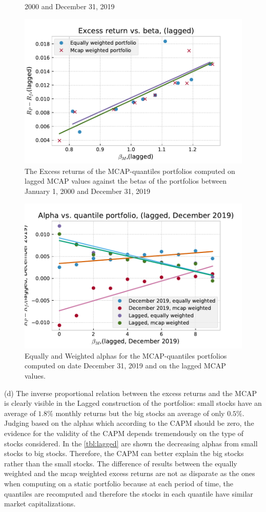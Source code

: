 \documentclass[10pt]{article}
\newenvironment{exercise}[2][Exercise]{\begin{trivlist}
  \item[\hskip \labelsep {\bfseries #1}\hskip \labelsep {\bfseries #2.}]}{\end{trivlist}}
\begin{document}
\begin{exercise}{2}
\begin{figure}[n]
{      2000 and December 31, 2019}
    \label{fig:december2019}
  \end{figure}
  \begin{figure}[H]
    \centering
    \includegraphics[width=0.7\linewidth]{lagged.pdf}
    \caption{The Excess returns of the MCAP-quantiles portfolios computed on
      lagged MCAP values against the betas of the portfolios between January 1,
      2000 and December 31, 2019}
    \label{fig:lagged}
  \end{figure}
  \begin{figure}[H]
    \centering
    \includegraphics[width=0.7\linewidth]{alphas.pdf}
    \caption{Equally and Weighted alphas for the MCAP-quantiles portfolios
      computed on date December 31, 2019 and on the lagged MCAP values.}
    \label{fig:alphas}
  \end{figure}


  (d) The inverse proportional relation between the excess returns and the MCAP
  is clearly visible in the Lagged construction of the portfolios: small stocks
  have an average of $1.8\%$ monthly returns but the big stocks an average of
  only $0.5\%$. Judging based on the alphas which according to the CAPM should
  be zero, the evidence for the validity of the CAPM depends tremendously on the
  type of stocks considered. In the \autoref{tbl:lagged} are shown the
  decreasing alphas from small stocks to big stocks. Therefore, the CAPM can
  better explain the big stocks rather than the small stocks. The difference of results
  between the equally weighted and the mcap weighted excess returns are not as
  disparate as the ones when computing on a static portfolio because at each
  period of time, the quantiles are recomputed and therefore the stocks in each
  quantile have similar market capitalizations.



\end{exercise}
\end{document}
